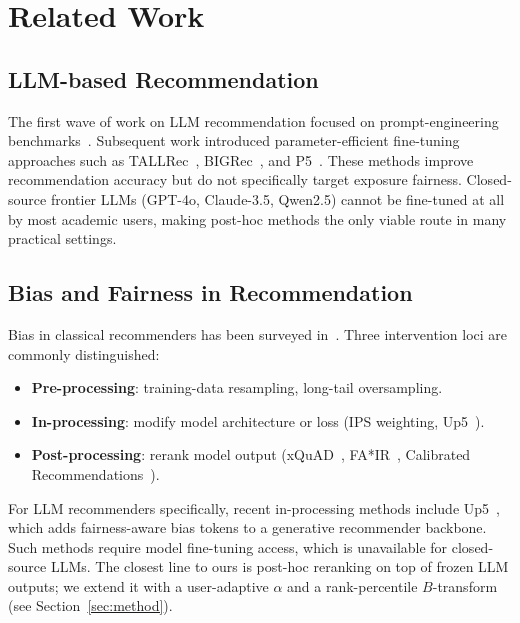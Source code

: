 \section{Related Work}
\label{sec:related}

\subsection{LLM-based Recommendation}

The first wave of work on LLM recommendation focused on prompt-engineering benchmarks~\cite{liu2023chatgpt,hou2024llmranker,wang2023genrec}. Subsequent work introduced parameter-efficient fine-tuning approaches such as TALLRec~\cite{bao2023tallrec}, BIGRec~\cite{li2024bigrec}, and P5~\cite{geng2022p5}. These methods improve recommendation accuracy but do not specifically target exposure fairness. Closed-source frontier LLMs (GPT-4o, Claude-3.5, Qwen2.5) cannot be fine-tuned at all by most academic users, making post-hoc methods the only viable route in many practical settings.

\subsection{Bias and Fairness in Recommendation}

Bias in classical recommenders has been surveyed in~\cite{chen2023biassurvey}. Three intervention loci are commonly distinguished:
\begin{itemize}
\item \textbf{Pre-processing}: training-data resampling, long-tail oversampling.
\item \textbf{In-processing}: modify model architecture or loss (IPS weighting, Up5~\cite{hua2023up5}).
\item \textbf{Post-processing}: rerank model output (xQuAD~\cite{santos2010xquad}, FA*IR~\cite{zehlike2017fair}, Calibrated Recommendations~\cite{steck2018calibrated}).
\end{itemize}

For LLM recommenders specifically, recent in-processing methods include Up5~\cite{hua2023up5}, which adds fairness-aware bias tokens to a generative recommender backbone. Such methods require model fine-tuning access, which is unavailable for closed-source LLMs. The closest line to ours is post-hoc reranking on top of frozen LLM outputs; we extend it with a user-adaptive $\alpha$ and a rank-percentile $B$-transform (see Section~\ref{sec:method}).

